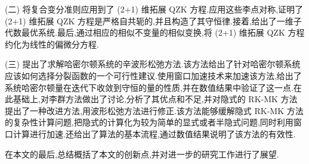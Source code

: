 (二) 将复合变分准则应用到了 (2+1) 维拓展 QZK 方程.应用这些李点对称,证明了 (2+1) 维拓展 QZK 方程是严格自共轭的,并且构造了其守恒律.接着,给出了一维子代数最优系统.最后,通过相应的相似不变量的相似变换,将 (2+1) 维拓展 QZK 方程约化为线性的偏微分方程.

(三) 提出了求解哈密尔顿系统的辛波形松弛方法.该方法给出了针对哈密尔顿系统应该如何选择分裂函数的一个可行性建议.使用窗口加速技术来加速该方法,给出了系统哈密尔顿量在迭代下收敛到守恒的量的性质,并在数值结果中验证了这一点.在此基础上,对李群方法做出了讨论,分析了其优点和不足,并对隐式的 RK-MK 方法提出了一种改进方法,用波形松弛方法进行修正.该方法能够缓解隐式 RK-MK 方法的复杂性计算问题,把隐式的计算化为较为简单的显式或者半隐式问题,同时利用窗口计算进行加速.还给出了算法的基本流程,通过数值结果说明了该方法的有效性.

在本文的最后,总结概括了本文的创新点,并对进一步的研究工作进行了展望.
